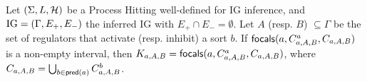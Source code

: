 \begin{comment}
We pose $\PHh_{b,A,B}$ (\eqref{eq:param_h}) the set of actions in $\PHh$ that hit a process of sort $b$ and can be fired in the previously defined context. A process of sort $b$ can be reached if it belongs to the context or if it is a bounce in $\PHh_{b,A,B}$; we call $L_{b,A,B}^?$ (\ref{eq:param_candidates}) the set of such candidates. The set of focal processes $L_{b,A,B}^*$ (\ref{eq:param_focal}) is the set of processes of $L_{b,A,B}^?$ that are not hit by an action in $\PHh_{b,A,B}$.
\begin{align}
\label{eq:param_h}
  \PHh_{b,A,B} & = \{ \PHfrappe{a_i}{b_j}{b_k} \in \PHh \mid \exists a \in \Gamma, a_i \in C_{b,A,B}^a \wedge b_j \in C_{b,A,B}^b\}
\\
\label{eq:param_candidates}
  L_{b,A,B}^? & =  C_{b,A,B}^b \cup \{ b_k\mid \exists \PHfrappe{a_i}{b_j}{b_k} \in \PHh_{b,A,B}\}
\\
\label{eq:param_focal}
  L_{b,A,B}^* & =  L_{b,A,B}^? \setminus \{ b_j \mid \exists \PHfrappe{a_i}{b_j}{b_k} \in \PHh_{b,A,B} \}
\end{align}

The focal processes in $L_{b,A,B}^*$ are the wanted parameters if they are attractors, \ie if the actions in $\PHh_{b,A,B}$ can only bounce in their direction. A set of processes is an attractor if it verifies the condition (\ref{eq:param_attractor}); in this case, this set of processes is also an interval.
\begin{align}
\label{eq:param_attractor}
  \forall \PHfrappe{b_i}{a_j}{a_k} \in \PHh_{a,A,B}, \forall a_f \in L_{a,A,B}^*, |f-k| < |f-j|
\end{align}
\end{comment}


\begin{theorem}
\label{thm:param_K}
Let $(\Sigma, L, \mathcal{H})$ be a Process Hitting well-defined for IG inference, and $\mathrm{IG} = (\Gamma,
E_+, E_-)$ the inferred IG with $E_+\cap E_-=\emptyset$.
Let $A$ (resp. $B$) $\subseteq \Gamma$ be the set of regulators that activate (resp. inhibit) a sort
$b$.
If $\mathsf{focals}(a,C^a_{a,A,B},C_{a,A,B})$ is a non-empty interval, 
	then $K_{a,A,B} = \mathsf{focals}(a, C^a_{a,A,B}, C_{a,A,B})$,
	where $C_{a,A,B} = \bigcup_{b\in\mathsf{pred}(a)} C^b_{a,A,B}$.
\end{theorem}



